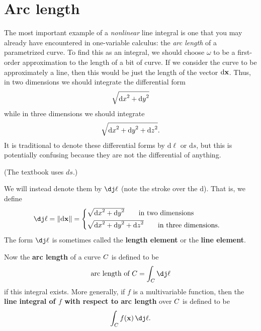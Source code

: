 \documentclass[12pt]{amsart}
\begin{document}
\section{Arc length}
\label{sec:arc-length}

The most important example of a \emph{nonlinear} line integral is one that you may already have encountered in one-variable calculus: the \emph{arc length} of a parametrized curve.
To find this as an integral, we should choose $\omega$ to be a first-order approximation to the length of a bit of curve.
If we consider the curve to be approximately a line, then this would be just the length of the vector ${\mathrm{d} \mathbf{x}}$.
Thus, in two dimensions we should integrate the differential form
\[ \sqrt{{\mathrm{d} x}^2+{\mathrm{d} y}^2}\]
while in three dimensions we should integrate
\[ \sqrt{{\mathrm{d} x}^2+{\mathrm{d} y}^2 + {\mathrm{d} z}^2}.\]
It is traditional to denote these differential forms by $\mathrm{d}\ell$ or $\mathrm{d}s$, but this is potentially confusing because they are not the differential of anything.
\begin{stewart}(The textbook uses $ds$.)\end{stewart}
We will instead denote them by $\dl$ (note the stroke over the $\mathrm{d}$).
That is, we define
\[ \dl = \mgn{\dpx} =
\begin{cases}
  \sqrt{\dx^2+\dy^2}\qquad\text{in two dimensions}\\[3pt]
  \sqrt{\dx^2+\dy^2+\dz^2}\qquad\text{in three dimensions}.
\end{cases}\]
The form $\dl$ is sometimes called the \textbf{length element} or the \textbf{line element}.

Now the \textbf{arc length} of a curve $C$ is defined to be
\[ \text{arc length of } \curve = \lint{\curve} \dl \]
if this integral exists.
More generally, if $f$ is a multivariable function, then the \textbf{line integral of $f$ with respect to arc length} over $C$ is defined to be
\[ \lint{\curve} f(\ptx)\,\dl. \]
\end{document}
